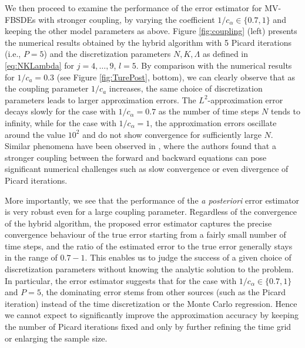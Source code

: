 \documentclass[11pt]{article}
\numberwithin{equation}{section}
\theoremstyle{definition}
\theoremstyle{remark}
\begin{document}
 
We then proceed to examine the performance of the error estimator 
for MV-FBSDEs with  stronger coupling,
by varying the coefficient  $1/c_\alpha \in \{ 0.7, 1\}$
and keeping the other model parameters  as above.
Figure \ref{fig:coupling} (left) presents
the numerical results obtained by 
the hybrid algorithm  with
5 Picard iterations (i.e., $P=5$)
and
the discretization parameters $N, K,\Lambda$ as defined in \eqref{eq:NKLambda}
for $j=4,\ldots, 9$, $l=5$.
By comparison with 
the numerical results for $1/c_a=0.3$
(see Figure \ref{fig:TurePost}, bottom),
we can clearly observe  that
 as the coupling parameter $1/c_a$ increases,
 the  same choice of  discretization parameters
 leads to larger approximation errors.
The $L^2$-approximation error 
decays slowly for  the case with $1/c_{\alpha}=0.7$
as the number of time steps $N$ tends to infinity, 
while for  the case with $1/c_{\alpha}=1$,
the approximation errors  oscillate around
the value  $10^2$ 
and do not show   convergence 
for sufficiently large $N$.
Similar phenomena have been observed 
in \cite{andrea2019,chassagneux2019,germain2019},
where the authors found that  a stronger coupling between the forward and backward equations
can 
pose significant numerical challenges 
such as %
 slow convergence or even divergence of  Picard iterations.



More importantly, we see that the performance of the \textit{a posteriori} error estimator is very robust 
even for a large coupling parameter.
Regardless of the convergence of the hybrid algorithm,
the proposed error estimator captures the precise convergence behaviour of the true error
starting from a fairly small number of time steps,
and 
the ratio of the estimated error to the true error
generally stays in  the  range of $0.7-1$.
This enables us to judge the success of a given choice of discretization parameters 
without knowing the analytic solution to the problem.
In particular,  the error estimator suggests 
that for the case with $1/c_\alpha\in \{0.7,1\}$ and $P=5$,  the dominating error stems from other  sources 
(such as the Picard iteration)
instead of the time discretization or the  Monte Carlo regression.
Hence 
we cannot expect to significantly improve the approximation accuracy 
by keeping the number of Picard iterations fixed and  
only by
further refining the time grid or enlarging the sample size.
\end{document}
